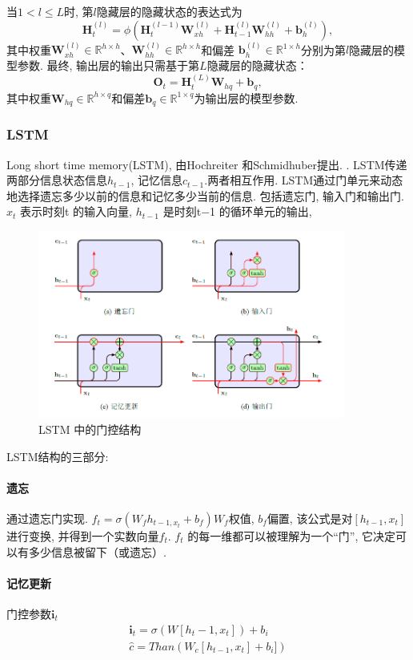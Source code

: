 \documentclass[a4paper]{article}
\theoremstyle{definition}
\numberwithin{equation}{section}
\begin{document}
当$1 < l \leq L$时, 第$l$隐藏层的隐藏状态的表达式为
$$\mathbf{H}_t^{(l)} = \phi(\mathbf{H}_t^{(l-1)} \mathbf{W}_{xh}^{(l)} + \mathbf{H}_{t-1}^{(l)} \mathbf{W}_{hh}^{(l)}  + \mathbf{b}_h^{(l)}), $$
其中权重$\mathbf{W}_{xh}^{(l)} \in \mathbb{R}^{h \times h}$、$\mathbf{W}_{hh}^{(l)} \in \mathbb{R}^{h \times h}$和偏差 $\mathbf{b}_h^{(l)} \in \mathbb{R}^{1 \times h}$分别为第$l$隐藏层的模型参数. 
最终, 输出层的输出只需基于第$L$隐藏层的隐藏状态：
$$\mathbf{O}_t = \mathbf{H}_t^{(L)} \mathbf{W}_{hq} + \mathbf{b}_q, $$
其中权重$\mathbf{W}_{hq} \in \mathbb{R}^{h \times q}$和偏差$\mathbf{b}_q \in \mathbb{R}^{1 \times q}$为输出层的模型参数. 

\subsubsection{LSTM}
Long short time memory(LSTM),  由Hochreiter 和Schmidhuber提出. \citep{HochreiterLong}. 
LSTM传递两部分信息状态信息$h_{t-1}$, 记忆信息$c_{t-1}$.两者相互作用. LSTM通过门单元来动态地选择遗忘多少以前的信息和记忆多少当前的信息. 包括遗忘门, 输入门和输出门. 
$x_t$ 表示时刻t 的输入向量, $h_{t−1}$ 是时刻t−1 的循环单元的输出, 
\begin{figure}[!htb]
    \center
\includegraphics[width=0.9\textwidth]{LSTM.png}
\caption{LSTM 中的门控结构}
\end{figure}
LSTM结构的三部分:
\paragraph{遗忘} 通过遗忘门实现.
$f_t=\sigma (W_f h_{t-1, x_t}+b_f)$$ W_f $权值, $b_f$偏置, 该公式是对$[h_{t−1}, x_t]$ 进行变换, 并得到一个实数向量$f_t$. $f_t$ 的每一维都可以被理解为一个“门”, 它决定可以有多少信息被留下（或遗忘）. 

\paragraph{记忆更新}
门控参数$\mathbf{i}_t$
\begin{align*}
    \mathbf{i}_t=\sigma(W[h_t-1, x_t])+b_i \\
    \hat{c}=Than(W_c[h_{t-1}, x_t]+b_i])
    \end{align*}
\end{document}
